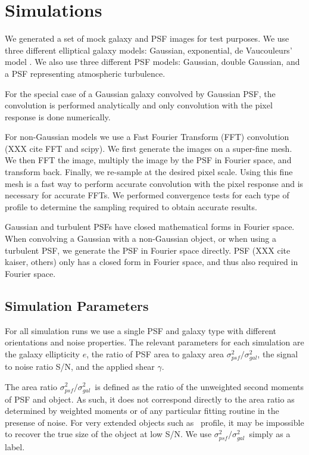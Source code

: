 \documentclass[12pt,preprint]{aastex}
\newcommand{\aratio}{\ensuremath{\sigma^2_{psf}/\sigma^2_{gal}}}
\begin{document}
\section{Simulations} \label{sec:sim}

We generated a set of mock galaxy and PSF images for test purposes.  We use
three different elliptical galaxy models: Gaussian, exponential, de
Vaucouleurs' model \citep{devauc1948}.  We also use three different PSF models:
Gaussian, double Gaussian, and a PSF representing atmospheric turbulence.

For the special case of a Gaussian galaxy convolved by Gaussian PSF, the
convolution is performed analytically and only convolution with the pixel
response is done numerically.  

For non-Gaussian models we use a Fast Fourier Transform (FFT) convolution (XXX
cite FFT and scipy).  We first generate the images on a super-fine mesh. We
then FFT the image, multiply the image by the PSF in Fourier space, and
transform back. Finally, we re-sample at the desired pixel scale.  Using this
fine mesh is a fast way to perform accurate convolution with the pixel response
and is necessary for accurate FFTs.  We performed convergence tests for each
type of profile to determine the sampling required to obtain accurate results.

Gaussian and turbulent PSFs have closed mathematical forms in Fourier space.
When convolving a Gaussian with a non-Gaussian object, or when using a
turbulent PSF, we generate the PSF in Fourier space directly.
PSF (XXX cite kaiser, others) only has a closed form in Fourier space, and thus
also required in Fourier space.

\subsection{Simulation Parameters}

For all simulation runs we use a single PSF and galaxy type with different
orientations and noise properties.  The relevant parameters for each simulation
are the galaxy ellipticity $e$, the ratio of PSF area to galaxy area \aratio, the
signal to noise ratio S/N, and the applied shear $\gamma$.

The area ratio \aratio\ is defined as the ratio of the unweighted second
moments of PSF and object.  As such, it does not correspond directly to the
area ratio as determined by weighted moments or of any particular fitting
routine in the presense of noise.  For very extended objects such as \devauc\
profile, it may be impossible to recover the true size of the object at
low S/N.  We use \aratio\ simply as a label.
\end{document}
